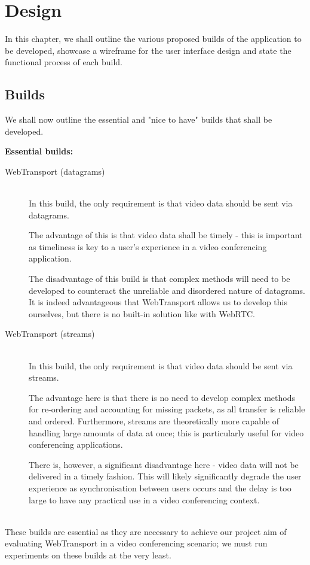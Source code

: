 
\chapter{Design}

In this chapter, we shall outline the various proposed builds of the application to be developed, showcase a wireframe for the user interface design and state the functional process of each build.

\section{Builds}

We shall now outline the essential and "nice to have" builds that shall be developed. 

\textbf{Essential builds:}
\begin{description}
\item[WebTransport (datagrams)]
\hfill \\
In this build, the only requirement is that video data should be sent via datagrams. 

The advantage of this is that video data shall be timely - this is important as timeliness is key to a user's experience in a video conferencing application.

The disadvantage of this build is that complex methods will need to be developed to counteract the unreliable and disordered nature of datagrams. It is indeed advantageous that WebTransport allows us to develop this ourselves, but there is no built-in solution like with WebRTC.
\hfill\\
\item[WebTransport (streams)]
\hfill \\
In this build, the only requirement is that video data should be sent via streams. 

The advantage here is that there is no need to develop complex methods for re-ordering and accounting for missing packets, as all transfer is reliable and ordered. Furthermore, streams are theoretically more capable of handling large amounts of data at once; this is particularly useful for video conferencing applications.

There is, however, a significant disadvantage here - video data will not be delivered in a timely fashion. This will likely significantly degrade the user experience as synchronisation between users occurs and the delay is too large to have any practical use in a video conferencing context.
\end{description}
\hfill\\
These builds are essential as they are necessary to achieve our project aim of evaluating WebTransport in a video conferencing scenario; we must run experiments on these builds at the very least.
\hfill\\

